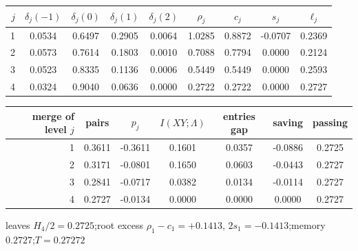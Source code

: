 \begin{tabular}{rcccccccc}
\toprule
$j$ & $\delta_j(-1)$ & $\delta_j(0)$ & $\delta_j(1)$ & $\delta_j(2)$ & $\rho_j$ & $c_j$ & $s_j$ & $\ell_j$ \\
\midrule
1 & 0.0534 & 0.6497 & 0.2905 & 0.0064 & 1.0285 & 0.8872 & -0.0707 & 0.2369 \\
2 & 0.0573 & 0.7614 & 0.1803 & 0.0010 & 0.7088 & 0.7794 & 0.0000 & 0.2124 \\
3 & 0.0523 & 0.8335 & 0.1136 & 0.0006 & 0.5449 & 0.5449 & 0.0000 & 0.2593 \\
4 & 0.0324 & 0.9040 & 0.0636 & 0.0000 & 0.2722 & 0.2722 & 0.0000 & 0.2727 \\
\bottomrule
\end{tabular}

\medskip

\begin{tabular}{rcccccc}
\toprule
merge of level $j$ & pairs & $p_j$ & $I(XY;\Lambda)$ & entries gap & saving & passing \\
\midrule
1 & 0.3611 & -0.3611 & 0.1601 & 0.0357 & -0.0886 & 0.2725 \\
2 & 0.3171 & -0.0801 & 0.1650 & 0.0603 & -0.0443 & 0.2727 \\
3 & 0.2841 & -0.0717 & 0.0382 & 0.0134 & -0.0114 & 0.2727 \\
4 & 0.2727 & -0.0134 & 0.0000 & 0.0000 & 0.0000 & 0.2727 \\
\bottomrule
\end{tabular}

\smallskip
{\footnotesize leaves $H_4/2 = 0.2725$;\quad root excess $\rho_1-c_1 = +0.1413$, $2s_1 = -0.1413$;\quad memory $0.2727$;\quad $T = 0.27272$}
